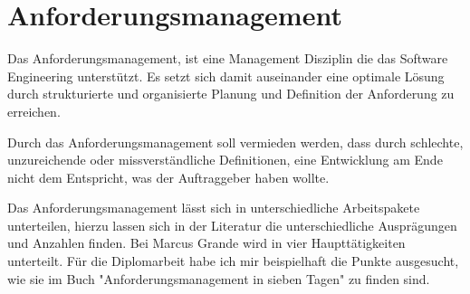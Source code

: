 \section{Anforderungsmanagement}

Das Anforderungsmanagement, ist eine Management Disziplin die das Software Engineering unterstützt. Es setzt sich damit auseinander eine optimale Lösung durch strukturierte und organisierte Planung und Definition der Anforderung zu erreichen.

Durch das Anforderungsmanagement soll vermieden werden, dass durch schlechte, unzureichende oder missverständliche Definitionen, eine Entwicklung am Ende nicht dem Entspricht, was der Auftraggeber haben wollte.

Das Anforderungsmanagement lässt sich in unterschiedliche Arbeitspakete unterteilen, hierzu lassen sich in der Literatur die unterschiedliche Ausprägungen und Anzahlen finden. Bei Marcus Grande\autocite[10]{100minAM} wird in vier Haupttätigkeiten unterteilt. Für die Diplomarbeit habe ich mir beispielhaft die Punkte ausgesucht, wie sie im Buch "Anforderungsmanagement in sieben Tagen"\autocite[30-31]{AMin.sieben.T} zu finden sind.  


